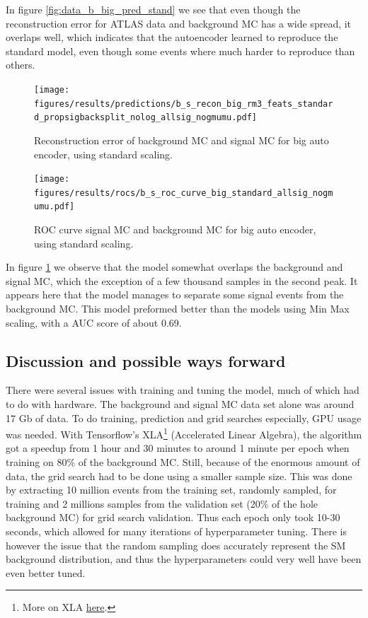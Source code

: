 \documentclass[ reprint, amsmath,amssymb, aps, nofootinbib]{revtex4-2}
\begin{document}
In figure \ref{fig:data_b_big_pred_stand} we see that even though the reconstruction error for ATLAS data and background MC has a wide spread, it overlaps well, which indicates that the autoencoder learned to reproduce the standard model, even though some events where much harder to reproduce than others. 

\begin{figure}[H]
    \centering
    \texttt{[image: figures/results/predictions/b\_s\_recon\_big\_rm3\_feats\_standard\_propsigbacksplit\_nolog\_allsig\_nogmumu.pdf]}
    \caption{Reconstruction error of background MC and signal MC for big auto encoder, using standard scaling. }
    \label{fig:s_b_big_pred_stand}
\end{figure}

\begin{figure}[H]
    \centering
         \texttt{[image: figures/results/rocs/b\_s\_roc\_curve\_big\_standard\_allsig\_nogmumu.pdf]}
         \caption{ROC curve signal MC and background MC for big auto encoder, using standard scaling.}
         \label{fig:s_b_big_roc_stand}
\end{figure}



In figure \ref{fig:s_b_big_pred_stand} we observe that the model somewhat overlaps the background and signal MC, which the exception of a few thousand samples in the second peak. It appears here that the model manages to separate some signal events from the background MC. This model preformed better than the models using Min Max scaling, with a AUC score of about 0.69. \par 

\subsection{Discussion and possible ways forward}
There were several issues with training and tuning the model, much of which had to do with hardware. The background and signal MC data set alone was around 17 Gb of data. To do training, prediction and grid searches especially, GPU usage was needed. With Tensorflow's XLA\footnote{More on XLA \href{https://www.tensorflow.org/xla}{here}.} (Accelerated Linear Algebra), the algorithm got a speedup from 1 hour and 30 minutes to around 1 minute per epoch when training on 80\% of the background MC. Still, because of the enormous amount of data, the grid search had to be done using a smaller sample size. This was done by extracting 10 million events from the training set, randomly sampled, for training and 2 millions samples from the validation set (20\% of the hole background MC) for grid search validation. Thus each epoch only took 10-30 seconds, which allowed for many iterations of hyperparameter tuning. There is however the issue that the random sampling does accurately represent the SM background distribution, and thus the hyperparameters could very well have been even better tuned.  \par \par
\end{document}
